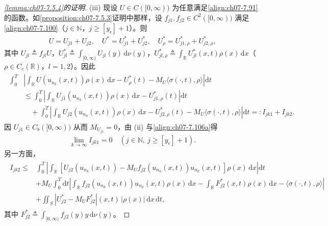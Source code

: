 \documentclass[../../main.tex]{subfiles}%
\begin{document}
\begin{proof}[\cref{lemma:ch07-7.5.4}的证明]
(iii) 现设 $U\in C([0,\infty))$ 为任意满足\eqref{align:ch07-7.91}的函数。如\cref{proposition:ch07-7.5.3}证明中那样，设 $f_{j1},f_{j2}\in C^2([0,\infty))$ 满足\eqref{align:ch07-7.100}（$j\in\mathbb{N}$，$j\geqslant[y_\epsilon]+1$）。则
\begin{align*}
U=U_{j1}+U_{j2},\quad U^*=U_{j1}^*+U_{j2}^*,\quad U_\rho^*=U_{j1,\rho}^*+U_{j2,\rho}^*,
\end{align*}
其中 $U_{jl}\triangleq f_{jl}U$，$U_{jl}^*\triangleq \int_{[0,\infty)}U_{jl}(y)\,\mathrm{d}\nu(y)$，$U_{jl,\rho}^*\triangleq \int_{\mathbb{R}}U_{jl}^*(x,t)\rho(x)\,\mathrm{d}x$（$\rho\in C_c(\mathbb{R})$，$l=1,2$）。因此
\begin{align}
\begin{aligned}
\int_0^T&\left|\int_{\mathbb{R}}U(u_{n_k}(x,t))\rho(x)\,\mathrm{d}x-U_\rho^*(t)-M_U\langle\sigma(\cdot,t),\rho\rangle\right|\mathrm{d}t\\
&\leqslant\int_0^T\left|\int_{\mathbb{R}}U_{j1}(u_{n_k}(x,t))\rho(x)\,\mathrm{d}x-U_{j1,\rho}^*(t)\right|\mathrm{d}t\\
&\quad+\int_0^T\left|\int_{\mathbb{R}}U_{j2}(u_{n_k}(x,t))\rho(x)\,\mathrm{d}x-U_{j2,\rho}^*(t)-M_U\langle\sigma(\cdot,t),\rho\rangle\right|\mathrm{d}t=:I_{jk1}+I_{jk2}.
\end{aligned} \label{align:ch07-7.151}
\end{align}
因 $U_{j1}\in C_b([0,\infty))$ 从而 $M_{U_{j1}}=0$，由 (ii) 与\eqref{align:ch07-7.106a}得
\begin{align}
\lim_{k\to\infty}I_{jk1}=0\quad(j\in\mathbb{N},\ j\geqslant[y_\epsilon]+1). \label{align:ch07-7.152}
\end{align}
另一方面，
\begin{align}
\begin{aligned}
I_{jk2}\leqslant{}&\int_0^T\left|\int_{\mathbb{R}}[U_{j2}(u_{n_k}(x,t))-M_U f_{j2}(u_{n_k}(x,t))u_{n_k}(x,t)]\rho(x)\,\mathrm{d}x\right|\mathrm{d}t\\
&+M_U\int_0^T\mathrm{d}t\left|\int_{\mathbb{R}}f_{j2}(u_{n_k}(x,t))u_{n_k}(x,t)\rho(x)\,\mathrm{d}x-\int_{\mathbb{R}}F_{j2}^*(x,t)\rho(x)\,\mathrm{d}x-\langle\sigma(\cdot,t),\rho\rangle\right|\\
&+\iint_S|U_{j2}^*-M_U F_{j2}^*|(x,t)\,|\rho(x)|\,\mathrm{d}x\,\mathrm{d}t,
\end{aligned} \label{align:ch07-7.153}
\end{align}
其中 $F_{j2}^*\triangleq \int_{[0,\infty)}f_{j2}(y)y\,\mathrm{d}\nu(y)$。


\end{proof}
\end{document}
